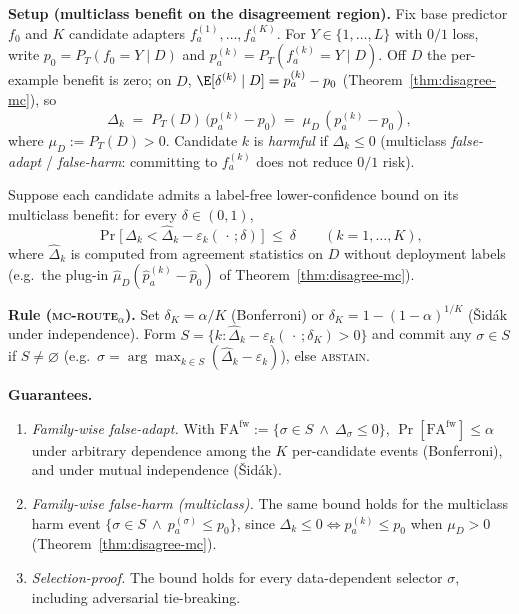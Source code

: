 %

\begin{theorem}
\label{thm:multiclass-multicand}
\textbf{Setup (multiclass benefit on the disagreement region).}
Fix base predictor $f_0$ and $K$ candidate adapters $f_a^{(1)},\dots,f_a^{(K)}$.
For $Y\in\{1,\dots,L\}$ with $0/1$ loss, write
$p_0=P_T(f_0{=}Y\mid D)$ and $p_a^{(k)}=P_T(f_a^{(k)}{=}Y\mid D)$.
Off $D$ the per-example benefit is zero; on $D$,
$\E[\delta^{(k)}\mid D]=p_a^{(k)}-p_0$ (Theorem~\ref{thm:disagree-mc}), so
\[
  \Delta_k \;=\; P_T(D)\,\bigl(p_a^{(k)}-p_0\bigr)
  \;=\; \mu_D\,(p_a^{(k)}-p_0),
\]
where $\mu_D:=P_T(D)>0$.  Candidate $k$ is \emph{harmful} if $\Delta_k\le0$ (multiclass
\emph{false-adapt} / \emph{false-harm}: committing to $f_a^{(k)}$ does not reduce $0/1$ risk).

Suppose each candidate admits a label-free lower-confidence bound on its multiclass benefit:
for every $\delta\in(0,1)$,
\begin{equation}\label{eq:mc-percand}
  \Pr\!\bigl[\,\Delta_k < \hat\Delta_k - \varepsilon_k(\,\cdot\,;\delta)\,\bigr]\ \le\ \delta
  \qquad(k=1,\dots,K),
\end{equation}
where $\hat\Delta_k$ is computed from agreement statistics on $D$ without deployment labels
(e.g.\ the plug-in $\hat\mu_D(\hat p_a^{(k)}-\hat p_0)$ of
Theorem~\ref{thm:disagree-mc}).

\textbf{Rule (\textsc{mc-route}$_\alpha$).}
Set $\delta_K=\alpha/K$ (Bonferroni) or $\delta_K=1-(1-\alpha)^{1/K}$ (\v Sid\'ak under
independence).  Form
$S=\{k:\hat\Delta_k-\varepsilon_k(\,\cdot\,;\delta_K)>0\}$ and commit any $\sigma\in S$ if
$S\neq\varnothing$ (e.g.\ $\sigma=\arg\max_{k\in S}(\hat\Delta_k-\varepsilon_k)$), else
\textsc{abstain}.

\textbf{Guarantees.}
\begin{enumerate}
\item[(i)] \emph{Family-wise false-adapt.} With
$\mathrm{FA}^{\mathrm{fw}}:=\{\sigma\in S\ \wedge\ \Delta_\sigma\le0\}$,
$\Pr[\mathrm{FA}^{\mathrm{fw}}]\le\alpha$ under arbitrary dependence among the $K$
per-candidate events (Bonferroni), and under mutual independence (\v Sid\'ak).
\item[(ii)] \emph{Family-wise false-harm (multiclass).} The same bound holds for the
multiclass harm event $\{\sigma\in S\ \wedge\ p_a^{(\sigma)}\le p_0\}$, since
$\Delta_k\le0\iff p_a^{(k)}\le p_0$ when $\mu_D>0$ (Theorem~\ref{thm:disagree-mc}).
\item[(iii)] \emph{Selection-proof.} The bound holds for every data-dependent selector
$\sigma$, including adversarial tie-breaking.
\end{enumerate}
\end{theorem}

